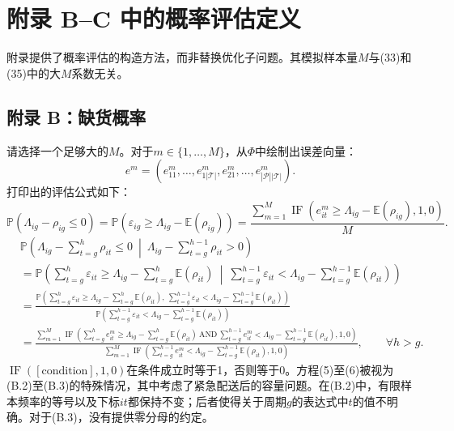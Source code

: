 \documentclass[10pt]{article}
\begin{document}
\section*{附录 B–C 中的概率评估定义}
附录提供了概率评估的构造方法，而非替换优化子问题。其模拟样本量$M$与(33)和(35)中的大$M$系数无关。

\subsection*{附录 B：缺货概率}
请选择一个足够大的$M$。对于$m\in\{1,\ldots,M\}$，从$\Phi$中绘制出误差向量：
\begin{equation}
 e^m=(e^m_{11},\ldots,e^m_{1|\mathcal T|},e^m_{21},\ldots,e^m_{|\mathcal P||\mathcal T|}).
\tag{B.1}
\end{equation}
打印出的评估公式如下：
\begin{equation}
\mathbb P(\Lambda_{ig}-\rho_{ig}\leqslant0)
=\mathbb P(\varepsilon_{ig}\geqslant\Lambda_{ig}-\mathbb E(\rho_{ig}))
=\frac{\sum_{m=1}^{M}\operatorname{IF}(e^m_{it}\geqslant\Lambda_{ig}-\mathbb E(\rho_{ig}),1,0)}{M}.
\tag{B.2}
\end{equation}
\begin{equation}
\begin{aligned}
&\mathbb P\left(\Lambda_{ig}-\sum_{t=g}^{h}\rho_{it}\leqslant0\ \middle|\ \Lambda_{ig}-\sum_{t=g}^{h-1}\rho_{it}>0\right)\\
&=\mathbb P\left(\sum_{t=g}^{h}\varepsilon_{it}\geqslant\Lambda_{ig}-\sum_{t=g}^{h}\mathbb E(\rho_{it})\ \middle|\ \sum_{t=g}^{h-1}\varepsilon_{it}<\Lambda_{ig}-\sum_{t=g}^{h-1}\mathbb E(\rho_{it})\right)\\
&=\frac{\mathbb P\left(\sum_{t=g}^{h}\varepsilon_{it}\geqslant\Lambda_{ig}-\sum_{t=g}^{h}\mathbb E(\rho_{it}),\ \sum_{t=g}^{h-1}\varepsilon_{it}<\Lambda_{ig}-\sum_{t=g}^{h-1}\mathbb E(\rho_{it})\right)}
{\mathbb P\left(\sum_{t=g}^{h-1}\varepsilon_{it}<\Lambda_{ig}-\sum_{t=g}^{h-1}\mathbb E(\rho_{it})\right)}\\
&=\frac{\displaystyle\sum_{m=1}^{M}\operatorname{IF}\left(\sum_{t=g}^{h}e^m_{it}\geqslant\Lambda_{ig}-\sum_{t=g}^{h}\mathbb E(\rho_{it})\ \mathrm{AND}\ \sum_{t=g}^{h-1}e^m_{it}<\Lambda_{ig}-\sum_{t=g}^{h-1}\mathbb E(\rho_{it}),1,0\right)}
{\displaystyle\sum_{m=1}^{M}\operatorname{IF}\left(\sum_{t=g}^{h-1}e^m_{it}<\Lambda_{ig}-\sum_{t=g}^{h-1}\mathbb E(\rho_{it}),1,0\right)},\qquad\forall h>g.
\end{aligned}\tag{B.3}
\end{equation}
$\operatorname{IF}([\text{condition}],1,0)$在条件成立时等于1，否则等于0。方程(5)至(6)被视为(B.2)至(B.3)的特殊情况，其中考虑了紧急配送后的容量问题。在(B.2)中，有限样本频率的等号以及下标$it$都保持不变；后者使得关于周期$g$的表达式中$t$的值不明确。对于(B.3)，没有提供零分母的约定。
\end{document}
